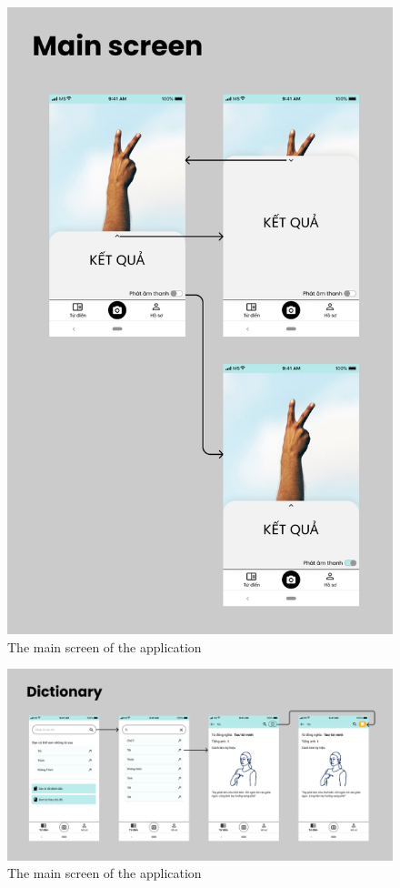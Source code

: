 \begin{figure}[H]
	\centering
	\includegraphics[height=0.8\textheight]{img/Chap5/Main_screen.png}
	\caption{The main screen of the application}
\end{figure}

\begin{figure}[H]
	\centering
	\includegraphics[width=\textwidth]{img/Chap5/Dictionary.png}
	\caption{The main screen of the application}
\end{figure}

